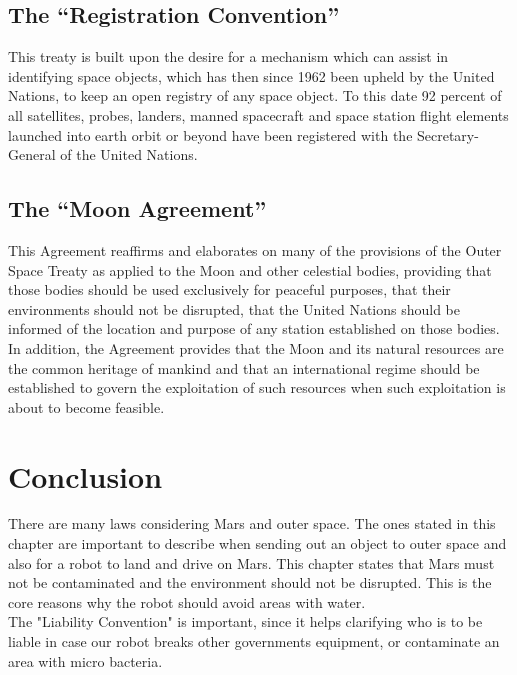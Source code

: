 \subsection{The “Registration Convention”}
This treaty is built upon the desire for a mechanism which can assist in identifying space objects, which has then since 1962 been upheld by the United Nations, to keep an open registry of any space object. 
To this date 92 percent of all satellites, probes, landers, manned spacecraft and space station flight elements launched into earth orbit or beyond have been registered with the Secretary-General of the United Nations\cite{Treaty4}. 

\subsection{The “Moon Agreement”} \label{ch:moonAgreement}
This Agreement reaffirms and elaborates on many of the provisions of the Outer Space Treaty as applied to the Moon and other celestial bodies, providing that those bodies should be used exclusively for peaceful purposes, that their environments should not be disrupted, that the United Nations should be informed of the location and purpose of any station established on those bodies. In addition, the Agreement provides that the Moon and its natural resources are the common heritage of mankind and that an international regime should be established to govern the exploitation of such resources when such exploitation is about to become feasible\cite{Treaty5}.

\section{Conclusion}
There are many laws considering Mars and outer space. The ones stated in this chapter are important to describe when sending out an object to outer space and also for a robot to land and drive on Mars. This chapter states that Mars must not be contaminated and the environment should not be disrupted. This  is the core reasons why the robot should avoid areas with water.\\
The "Liability Convention" is important, since it helps clarifying who is to be liable in case our robot breaks other governments equipment, or contaminate an area with micro bacteria.
